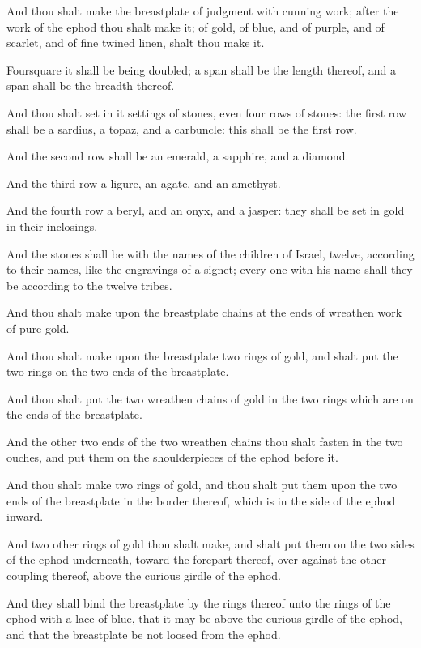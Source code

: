 \Verse And thou shalt make the breastplate of judgment with cunning work; after the work of the ephod thou shalt make it; of gold, of blue, and of purple, and of scarlet, and of fine twined linen, shalt thou make it.

\Verse Foursquare it shall be being doubled; a span shall be the length thereof, and a span shall be the breadth thereof.

\Verse And thou shalt set in it settings of stones, even four rows of stones: the first row shall be a sardius, a topaz, and a carbuncle: this shall be the first row.

\Verse And the second row shall be an emerald, a sapphire, and a diamond.

\Verse And the third row a ligure, an agate, and an amethyst.

\Verse And the fourth row a beryl, and an onyx, and a jasper: they shall be set in gold in their inclosings.

\Verse And the stones shall be with the names of the children of Israel, twelve, according to their names, like the engravings of a signet; every one with his name shall they be according to the twelve tribes.

\Verse And thou shalt make upon the breastplate chains at the ends of wreathen work of pure gold.

\Verse And thou shalt make upon the breastplate two rings of gold, and shalt put the two rings on the two ends of the breastplate.

\Verse And thou shalt put the two wreathen chains of gold in the two rings which are on the ends of the breastplate.

\Verse And the other two ends of the two wreathen chains thou shalt fasten in the two ouches, and put them on the shoulderpieces of the ephod before it.

\Verse And thou shalt make two rings of gold, and thou shalt put them upon the two ends of the breastplate in the border thereof, which is in the side of the ephod inward.

\Verse And two other rings of gold thou shalt make, and shalt put them on the two sides of the ephod underneath, toward the forepart thereof, over against the other coupling thereof, above the curious girdle of the ephod.

\Verse And they shall bind the breastplate by the rings thereof unto the rings of the ephod with a lace of blue, that it may be above the curious girdle of the ephod, and that the breastplate be not loosed from the ephod.


